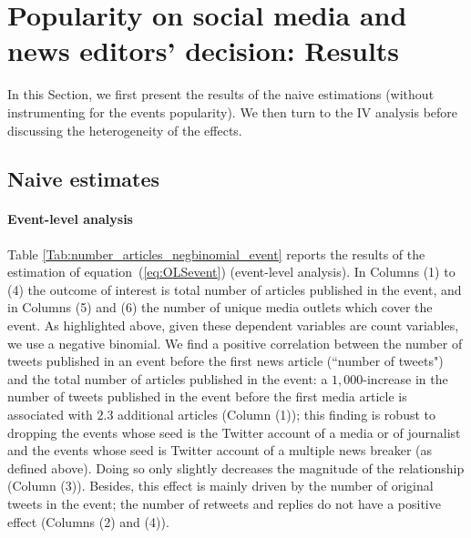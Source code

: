 \section{Popularity on social media and news editors' decision: Results\label{Sec:Results}}

In this Section, we first present the results of the naive estimations (without instrumenting for the events popularity). We then turn to the IV analysis before discussing the heterogeneity of the effects.


\subsection{Naive estimates}

\paragraph{Event-level analysis}

Table \ref{Tab:number_articles_negbinomial_event} reports the results of the estimation of equation~(\ref{eq:OLSevent}) (event-level analysis). In Columns (1) to (4) the outcome of interest is total number of articles published in the event, and in Columns (5) and (6) the number of unique media outlets which cover the event. As highlighted above, given these dependent variables are count variables, we use a negative binomial. We find a positive correlation between the number of tweets published in an event before the first news article (``number of tweets") and the total number of articles published in the event: a $1,000$-increase in the number of tweets published in the event before the first media article is associated with $2.3$ additional articles (Column (1)); this finding is robust to dropping the events whose seed is the Twitter account of a media or of journalist and the events whose seed is Twitter account of a multiple news breaker (as defined above). Doing so only slightly decreases the magnitude of the relationship (Column (3)). Besides, this effect is mainly driven by the number of original tweets in the event; the number of retweets and replies do not have a positive effect (Columns (2) and (4)).

